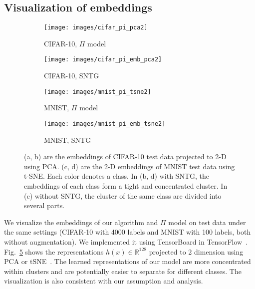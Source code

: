 \documentclass[10pt,twocolumn,letterpaper]{article}
\begin{document}
\subsection{Visualization of embeddings}
\label{sec:vis}
\vspace{-.1cm}
\begin{figure}[t]\vspace{-.3cm}
	\centering
	\begin{subfigure}{.234\textwidth}
		\centering
		\texttt{[image: images/cifar\_pi\_pca2]}\vspace{-.2cm}
		\caption{CIFAR-10, $\Pi$ model}
		\label{fig:sub1}
	\end{subfigure}
	\begin{subfigure}{.234\textwidth}
		\centering
		\texttt{[image: images/cifar\_pi\_emb\_pca2]}\vspace{-.2cm}
		\caption{CIFAR-10, SNTG}
		\label{fig:sub2}
	\end{subfigure}
	\begin{subfigure}{.234\textwidth}
		\centering
		\texttt{[image: images/mnist\_pi\_tsne2]}\vspace{-.2cm}
		\caption{MNIST, $\Pi$ model}
		\label{fig:sub3}
	\end{subfigure}
	\begin{subfigure}{.234\textwidth}
		\centering
		\texttt{[image: images/mnist\_pi\_emb\_tsne2]}\vspace{-.2cm}
		\caption{MNIST, SNTG}
		\label{fig:sub4}
	\end{subfigure}\vspace{-.2cm}
	\caption{(a, b) are the embeddings of CIFAR-10 test data projected to 2-D using PCA. (c, d) are the 2-D embeddings of MNIST test data using t-SNE. Each color denotes a class. In (b, d) with SNTG, the embeddings of each class form a tight and concentrated cluster. In (c) without SNTG, the cluster of the same class are divided into several parts.}
	\label{fig:embed}\vspace{-.4cm}
\end{figure}
We visualize the embeddings of our algorithm and $\Pi$ model on test data under the same settings (CIFAR-10 with 4000 labels and MNIST with 100 labels, both without augmentation). We implemented it using TensorBoard in TensorFlow~\cite{abadi2016tensorflow}. Fig.~\ref{fig:embed} shows the representations $h(x)\in \mathbb{R}^{128}$ projected to 2 dimension using PCA or tSNE~\cite{maaten2008visualizing}.
The learned representations of our model are more concentrated within clusters and are potentially easier to separate for different classes. The visualization is also consistent with our assumption and analysis.
\end{document}
